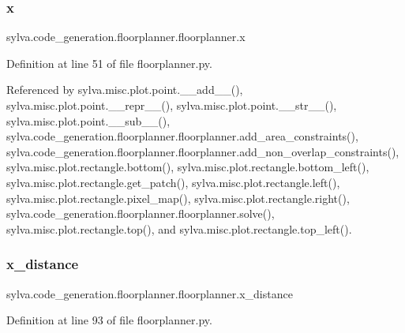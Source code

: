 \subsubsection{\texorpdfstring{x}{x}}
{\footnotesize\ttfamily sylva.\+code\+\_\+generation.\+floorplanner.\+floorplanner.\+x}



Definition at line 51 of file floorplanner.\+py.



Referenced by sylva.\+misc.\+plot.\+point.\+\_\+\+\_\+add\+\_\+\+\_\+(), sylva.\+misc.\+plot.\+point.\+\_\+\+\_\+repr\+\_\+\+\_\+(), sylva.\+misc.\+plot.\+point.\+\_\+\+\_\+str\+\_\+\+\_\+(), sylva.\+misc.\+plot.\+point.\+\_\+\+\_\+sub\+\_\+\+\_\+(), sylva.\+code\+\_\+generation.\+floorplanner.\+floorplanner.\+add\+\_\+area\+\_\+constraints(), sylva.\+code\+\_\+generation.\+floorplanner.\+floorplanner.\+add\+\_\+non\+\_\+overlap\+\_\+constraints(), sylva.\+misc.\+plot.\+rectangle.\+bottom(), sylva.\+misc.\+plot.\+rectangle.\+bottom\+\_\+left(), sylva.\+misc.\+plot.\+rectangle.\+get\+\_\+patch(), sylva.\+misc.\+plot.\+rectangle.\+left(), sylva.\+misc.\+plot.\+rectangle.\+pixel\+\_\+map(), sylva.\+misc.\+plot.\+rectangle.\+right(), sylva.\+code\+\_\+generation.\+floorplanner.\+floorplanner.\+solve(), sylva.\+misc.\+plot.\+rectangle.\+top(), and sylva.\+misc.\+plot.\+rectangle.\+top\+\_\+left().

\mbox{\label{classsylva_1_1code__generation_1_1floorplanner_1_1floorplanner_a1b95b56881d41dd6c5e1a66e6a6218cf}} 
\subsubsection{\texorpdfstring{x\+\_\+distance}{x\_distance}}
{\footnotesize\ttfamily sylva.\+code\+\_\+generation.\+floorplanner.\+floorplanner.\+x\+\_\+distance}



Definition at line 93 of file floorplanner.\+py.

\mbox{\label{classsylva_1_1code__generation_1_1floorplanner_1_1floorplanner_a583eb5cc30fb2978384746da5b4b440f}} 
